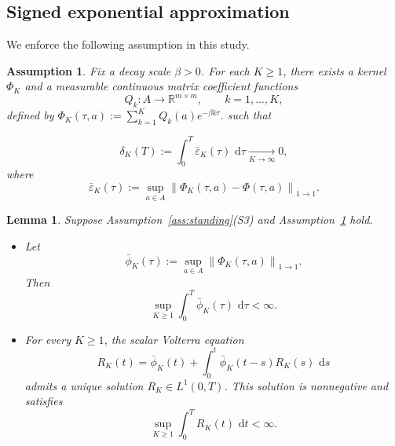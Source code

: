 \documentclass[11pt]{article}
\newtheorem{assumption}{Assumption}[section]
\newtheorem{lemma}[theorem]{Lemma}
\theoremstyle{remarkitalic}
\theoremstyle{remarkitalic}
\newcommand{\R}{\mathbb R}
\newcommand{\dd}{\,\mathrm d}
\newcommand{\1}{\mathbf 1}
\newcommand{\norm}[1]{\left\lVert #1 \right\rVert}
\begin{document}
\subsection{Signed exponential approximation}

We enforce the following assumption in this study. 




\begin{assumption}
\label{ass:kernel_approx_strong}
Fix a decay scale $\beta>0$. For each $K\geq 1$, there exists a kernel $\Phi_K$ and a measurable continuous matrix coefficient functions
\[
    Q_k:A\to\R^{m\times m},
    \qquad k=1,\dots,K,
\]
defined by $
    \Phi_K(\tau,a)
    :=
    \sum_{k=1}^K Q_k(a)e^{-\beta k\tau}.
$ such that

\[\delta_K(T)
    :=
    \int_0^T \bar\varepsilon_K(\tau)\,\dd\tau
    \underset{K\to\infty}{\longrightarrow}0,\] where \[\bar\varepsilon_K(\tau)
    :=
    \sup_{a\in A}
    \norm{\Phi_K(\tau,a)-\Phi(\tau,a)}_{1\to 1}.\]
\end{assumption}


\begin{lemma}\label{lemma:bounds}
Suppose Assumption~\ref{ass:standing}(S3) and
Assumption~\ref{ass:kernel_approx_strong} hold.
\begin{itemize}
    \item[(i)]
    Let
    \[
        \bar\phi_K(\tau)
        :=
        \sup_{a\in A}
        \norm{\Phi_K(\tau,a)}_{1\to1}.
    \]
    Then
    \[
        \sup_{K\ge1}
        \int_0^T \bar\phi_K(\tau)\,\dd\tau
        <\infty.
    \]

    \item[(ii)]
    For every $K\ge1$, the scalar Volterra equation
    \begin{equation}\label{eq:volterra}
        R_K(t)
        =
        \bar\phi_K(t)
        +
        \int_0^t
        \bar\phi_K(t-s)R_K(s)\,\dd s
    \end{equation}
    admits a unique solution $R_K\in L^1(0,T)$. This solution is
    nonnegative and satisfies
    \[
        \sup_{K\ge1}
        \int_0^T R_K(t)\,\dd t
        <\infty.
    \]
\end{itemize}
\end{lemma}
\end{document}
